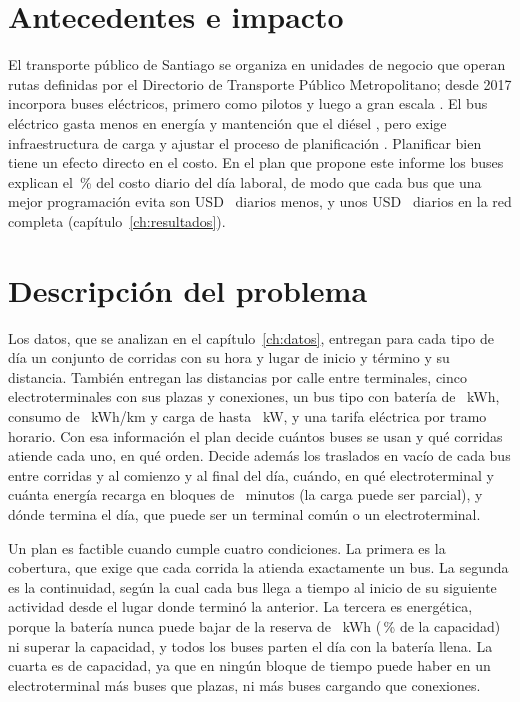 
\section{Antecedentes e impacto}
\label{sec:antecedentes}

El transporte público de Santiago se organiza en unidades de negocio que operan rutas definidas por el Directorio de Transporte Público Metropolitano; desde 2017 incorpora buses eléctricos, primero como pilotos y luego a gran escala \cite{galarza_pilotstoscale_2020}. El bus eléctrico gasta menos en energía y mantención que el diésel \cite{galarza_pilotstoscale_2020}, pero exige infraestructura de carga y ajustar el proceso de planificación \cite{hall_adjustmentsplanning_2018}. Planificar bien tiene un efecto directo en el costo. En el plan que propone este informe los buses explican el \PctFlotaPlanLaboral\,\% del costo diario del día laboral, de modo que cada bus que una mejor programación evita son USD~\CostoBus{} diarios menos, y unos USD~\AhorroCompFlota{} diarios en la red completa (capítulo~\ref{ch:resultados}).

\section{Descripción del problema}
\label{sec:descripcion}

Los datos, que se analizan en el capítulo~\ref{ch:datos}, entregan para cada tipo de día un conjunto de corridas con su hora y lugar de inicio y término y su distancia. También entregan las distancias por calle entre terminales, cinco electroterminales con sus plazas y conexiones, un bus tipo con batería de \Bateria~kWh, consumo de \Consumo~kWh/km y carga de hasta \Potencia~kW, y una tarifa eléctrica por tramo horario. Con esa información el plan decide cuántos buses se usan y qué corridas atiende cada uno, en qué orden. Decide además los traslados en vacío de cada bus entre corridas y al comienzo y al final del día, cuándo, en qué electroterminal y cuánta energía recarga en bloques de \MinutosBloque~minutos (la carga puede ser parcial), y dónde termina el día, que puede ser un terminal común o un electroterminal.

Un plan es factible cuando cumple cuatro condiciones. La primera es la cobertura, que exige que cada corrida la atienda exactamente un bus. La segunda es la continuidad, según la cual cada bus llega a tiempo al inicio de su siguiente actividad desde el lugar donde terminó la anterior. La tercera es energética, porque la batería nunca puede bajar de la reserva de \Reserva~kWh (\PctReserva\,\% de la capacidad) ni superar la capacidad, y todos los buses parten el día con la batería llena. La cuarta es de capacidad, ya que en ningún bloque de tiempo puede haber en un electroterminal más buses que plazas, ni más buses cargando que conexiones.

